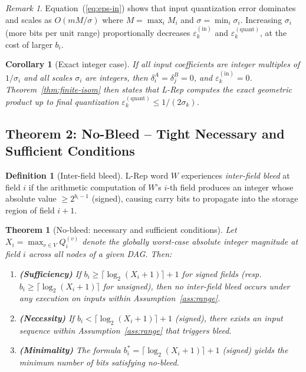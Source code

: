 \documentclass[11pt,a4paper]{article}
\theoremstyle{definition}
\newtheorem{definition}{Definition}[section]
\theoremstyle{plain}
\newtheorem{theorem}{Theorem}[section]
\newtheorem{corollary}{Corollary}[section]
\theoremstyle{remark}
\newtheorem{remark}{Remark}[section]
\begin{document}
\begin{remark}
Equation~(\ref{eq:eps-in}) shows that input quantization error dominates and scales as $O(mM/\sigma)$ where $M = \max_i M_i$ and $\sigma = \min_i \sigma_i$.  Increasing $\sigma_i$ (more bits per unit range) proportionally decreases $\varepsilon_k^{(\mathrm{in})}$ and $\varepsilon_k^{(\mathrm{quant})}$, at the cost of larger $b_i$.
\end{remark}

\begin{corollary}[Exact integer case]
\label{cor:exact}
If all input coefficients are integer multiples of $1/\sigma_i$ and all scales $\sigma_i$ are integers, then $\delta_i^A = \delta_j^B = 0$, and $\varepsilon_k^{(\mathrm{in})} = 0$.  Theorem~\ref{thm:finite-isom} then states that L-Rep computes the exact geometric product up to final quantization $\varepsilon_k^{(\mathrm{quant})} \le 1/(2\sigma_k)$.
\end{corollary}

\subsection{Theorem 2: No-Bleed -- Tight Necessary and Sufficient Conditions}
\label{sec:nobleed}

\begin{definition}[Inter-field bleed]
L-Rep word $W$ experiences \emph{inter-field bleed} at field $i$ if the arithmetic computation of $W$'s $i$-th field produces an integer whose absolute value $\ge 2^{b_i-1}$ (signed), causing carry bits to propagate into the storage region of field $i+1$.
\end{definition}

\begin{theorem}[No-bleed: necessary and sufficient conditions]
\label{thm:nobleed}
Let $X_i = \max_{v\in V} Q_i^{(v)}$ denote the globally worst-case absolute integer magnitude at field $i$ across all nodes of a given DAG.  Then:

\begin{enumerate}
  \item \textbf{(Sufficiency)} If $b_i \ge \lceil \log_2(X_i + 1)\rceil + 1$ for signed fields (resp. $b_i \ge \lceil \log_2(X_i + 1)\rceil$ for unsigned), then no inter-field bleed occurs under any execution on inputs within Assumption~\ref{ass:range}.

  \item \textbf{(Necessity)} If $b_i < \lceil \log_2(X_i + 1)\rceil + 1$ (signed), there exists an input sequence within Assumption~\ref{ass:range} that triggers bleed.

  \item \textbf{(Minimality)} The formula $b_i^* = \lceil \log_2(X_i + 1)\rceil + 1$ (signed) yields the minimum number of bits satisfying no-bleed.
\end{enumerate}
\end{theorem}
\end{document}
